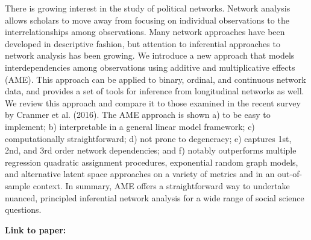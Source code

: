 There is growing interest in the study of political networks. Network analysis allows scholars to move away from focusing on individual observations to the interrelationships among observations. Many network approaches have been developed in descriptive fashion, but attention to inferential approaches to network analysis has been growing. We introduce a new approach that models interdependencies among observations using additive and multiplicative effects (AME). This approach can be applied to binary, ordinal, and continuous network data, and provides a set of tools for inference from longitudinal networks as well. We review this approach and compare it to those examined in the recent survey by Cranmer et al. (2016).  The AME approach is shown a) to be easy to implement; b) interpretable in a general linear model framework; c) computationally straightforward; d) not prone to degeneracy; e) captures 1st, 2nd, and 3rd order network dependencies; and f) notably outperforms multiple regression quadratic assignment procedures, exponential random graph models, and alternative latent space approaches on a variety of metrics and in an out-of-sample context. In summary, AME offers a straightforward way to undertake nuanced, principled inferential network analysis for a wide range of social science questions. 


\vspace{5mm}
\noindent \textbf{Link to paper:} 